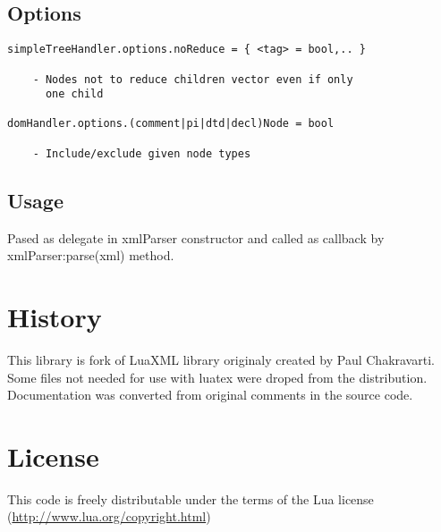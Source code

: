 \documentclass{ltxdoc}
\begin{document}
\subsection{Options}

\begin{verbatim}
simpleTreeHandler.options.noReduce = { <tag> = bool,.. }

    - Nodes not to reduce children vector even if only 
      one child

domHandler.options.(comment|pi|dtd|decl)Node = bool 

    - Include/exclude given node types
\end{verbatim}
\subsection{Usage}

Pased as delegate in xmlParser constructor and called as callback by
xmlParser:parse(xml) method.

\section{History}

This library is fork of LuaXML library originaly created by Paul
Chakravarti.  Some files not needed for use with luatex were droped from the distribution.
Documentation was converted from original comments in the source code.

\section{License}

This code is freely distributable under the terms of the Lua license
(\url{http://www.lua.org/copyright.html})
\end{document}
